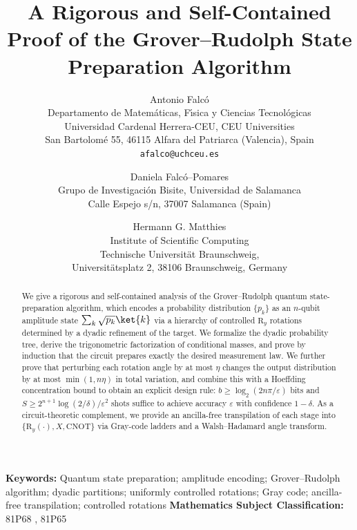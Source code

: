\documentclass{article}
\newcommand{\keywords}[1]{\par\noindent\textbf{Keywords:} #1\par}
\newcommand{\RY}{\mathrm{R}_y}
\newcommand{\CNOT}{\mathrm{CNOT}}
\numberwithin{equation}{section}
\begin{document}
\title{A Rigorous and Self-Contained Proof of the Grover–Rudolph State Preparation Algorithm}

\author{%
Antonio Falc\'o\\
Departamento de Matem\'aticas, F\'{\i}sica y Ciencias Tecnol\'ogicas\\
Universidad Cardenal Herrera-CEU, CEU Universities\\
San Bartolom\'e 55, 46115 Alfara del Patriarca (Valencia), Spain\\
\texttt{afalco@uchceu.es}
\and
Daniela Falc\'o--Pomares\\
Grupo de Investigaci\'on Bisite, Universidad de Salamanca\\
Calle Espejo s/n, 37007 Salamanca (Spain)
\and
Hermann G. Matthies\\
Institute of Scientific Computing\\
Technische Universit\"at Braunschweig, \\ 
Universit\"atsplatz 2, 38106 Braunschweig, Germany
}

\maketitle

\begin{abstract}
We give a rigorous and self-contained analysis of the Grover--Rudolph quantum state-preparation
algorithm, which encodes a probability distribution $\{p_k\}$ as an $n$-qubit amplitude state
$\sum_k\sqrt{p_k}\ket{k}$ via a hierarchy of controlled $\RY$ rotations determined by a dyadic
refinement of the target.
We formalize the dyadic probability tree, derive the trigonometric factorization of conditional
masses, and prove by induction that the circuit prepares exactly the desired measurement law.
We further prove that perturbing each rotation angle by at most $\eta$ changes the output
distribution by at most $\min(1,n\eta)$ in total variation, and combine this with a Hoeffding
concentration bound to obtain an explicit design rule: $b\ge\log_2(2n\pi/\varepsilon)$ bits and
$S\ge 2^{n+1}\log(2/\delta)/\varepsilon^2$ shots suffice to achieve accuracy $\varepsilon$
with confidence $1-\delta$.
As a circuit-theoretic complement, we provide an ancilla-free transpilation of each stage into
$\{\RY(\cdot),X,\CNOT\}$ via Gray-code ladders and a Walsh--Hadamard angle transform.
\end{abstract}

\keywords{Quantum state preparation; amplitude encoding; Grover--Rudolph algorithm; dyadic partitions;
uniformly controlled rotations; Gray code; ancilla-free transpilation; controlled rotations
\newline
\textbf{Mathematics Subject Classification:} 81P68 , 81P65}
\end{document}
